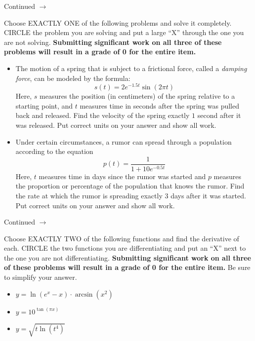 \documentclass[addpoints]{exam}
\def\pageturn{\vfill
\begin{flushright}
	\begin{small}
		Continued $\rightarrow$
	\end{small}
\end{flushright}
\newpage}
\begin{document}
\begin{questions}

\pageturn


\question[16] Choose EXACTLY ONE of the following problems and solve it completely. CIRCLE the problem you are solving and put a large ``X'' through the one you are not solving. \textbf{Submitting significant work on all three of these problems will result in a grade of 0 for the entire item. } 

\begin{itemize}
	\item The motion of a spring that is subject to a frictional force, called a \emph{damping force}, can be modeled by the formula: 
	\[ s(t) = 2e^{-1.5t} \sin(2\pi t)\] 
Here, $s$ measures the position (in centimeters) of the spring relative to a starting point, and $t$ measures time in seconds after the spring was pulled back and released. Find the velocity of the spring exactly $1$ second after it was released. Put correct units on your answer and show all work. 

	\item Under certain circumstances, a rumor can spread through a population according to the equation
	\[ p(t) = \frac{1}{1 + 10e^{-0.5t}} \]
Here, $t$ measures time in days since the rumor was started and $p$ measures the proportion or percentage of the population that knows the rumor. Find the rate at which the rumor is spreading exactly 3 days after it was started.	Put correct units on your answer and show all work. 

\end{itemize}


\pageturn

\question[16] Choose EXACTLY TWO of the following functions and find the derivative of each. CIRCLE the two functions you are differentiating and put an ``X'' next to the one you are not differentiating. \textbf{Submitting significant work on all three of these problems will result in a grade of 0 for the entire item. } Be sure to simplify your answer.  

\begin{itemize}
	 \item $y = \ln(e^x - x) \cdot \arcsin(x^2)$ 
	\item $y = 10^{\tan(\pi x)}$ 
	\item $y = \sqrt{t \ln(t^4)}$  
\end{itemize}


\end{questions}
\end{document}
